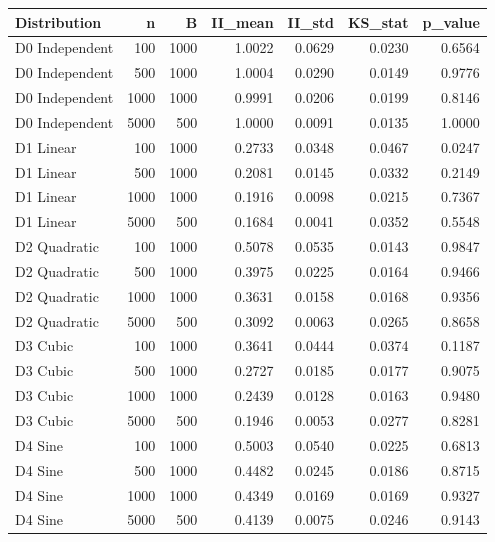 
\begin{tabular}{lrrrrrr}
\toprule
   Distribution &     n &     B &  II\_mean &  II\_std &  KS\_stat &  p\_value \\
\midrule
 D0 Independent &   100 &  1000 &   1.0022 &  0.0629 &   0.0230 &   0.6564 \\
 D0 Independent &   500 &  1000 &   1.0004 &  0.0290 &   0.0149 &   0.9776 \\
 D0 Independent &  1000 &  1000 &   0.9991 &  0.0206 &   0.0199 &   0.8146 \\
 D0 Independent &  5000 &   500 &   1.0000 &  0.0091 &   0.0135 &   1.0000 \\
      D1 Linear &   100 &  1000 &   0.2733 &  0.0348 &   0.0467 &   0.0247 \\
      D1 Linear &   500 &  1000 &   0.2081 &  0.0145 &   0.0332 &   0.2149 \\
      D1 Linear &  1000 &  1000 &   0.1916 &  0.0098 &   0.0215 &   0.7367 \\
      D1 Linear &  5000 &   500 &   0.1684 &  0.0041 &   0.0352 &   0.5548 \\
   D2 Quadratic &   100 &  1000 &   0.5078 &  0.0535 &   0.0143 &   0.9847 \\
   D2 Quadratic &   500 &  1000 &   0.3975 &  0.0225 &   0.0164 &   0.9466 \\
   D2 Quadratic &  1000 &  1000 &   0.3631 &  0.0158 &   0.0168 &   0.9356 \\
   D2 Quadratic &  5000 &   500 &   0.3092 &  0.0063 &   0.0265 &   0.8658 \\
       D3 Cubic &   100 &  1000 &   0.3641 &  0.0444 &   0.0374 &   0.1187 \\
       D3 Cubic &   500 &  1000 &   0.2727 &  0.0185 &   0.0177 &   0.9075 \\
       D3 Cubic &  1000 &  1000 &   0.2439 &  0.0128 &   0.0163 &   0.9480 \\
       D3 Cubic &  5000 &   500 &   0.1946 &  0.0053 &   0.0277 &   0.8281 \\
        D4 Sine &   100 &  1000 &   0.5003 &  0.0540 &   0.0225 &   0.6813 \\
        D4 Sine &   500 &  1000 &   0.4482 &  0.0245 &   0.0186 &   0.8715 \\
        D4 Sine &  1000 &  1000 &   0.4349 &  0.0169 &   0.0169 &   0.9327 \\
        D4 Sine &  5000 &   500 &   0.4139 &  0.0075 &   0.0246 &   0.9143 \\

\end{tabular}
